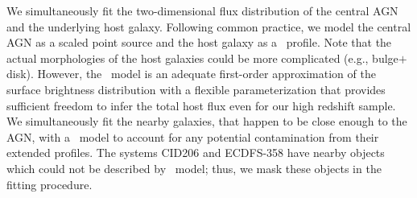 \documentclass[apj]{emulateapj}
\begin{document}
We simultaneously fit the two-dimensional flux distribution of the central AGN and the underlying host galaxy. Following common practice, we model the central AGN as a scaled point source and the host galaxy as a \sersic\ profile. Note that the actual morphologies of the host galaxies could be more complicated (e.g., bulge$+$disk). However, the \sersic\ model is an adequate first-order approximation of the surface brightness distribution with a flexible parameterization that provides sufficient freedom to infer the total host flux even for our high redshift sample. We simultaneously fit the nearby galaxies, that happen to be close enough to the AGN, with a \sersic\ model to account for any potential contamination from their extended profiles. The systems CID206 and ECDFS-358 have nearby objects which could not be described by \sersic\ model; thus, we mask these objects in the fitting procedure.
\end{document}
